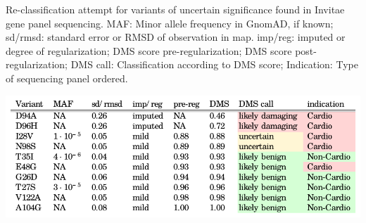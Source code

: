 \begin{table}[h!]
	\centering
	\caption{Re-classification attempt for variants of uncertain significance found in Invitae gene panel sequencing. MAF: Minor allele frequency in GnomAD, if known; sd/rmsd: standard error or RMSD of observation in map. imp/reg: imputed or degree of regularization; DMS score pre-regularization; DMS score post-regularization; DMS call: Classification according to DMS score; Indication: Type of sequencing panel ordered.\newline}
	\includegraphics[width=\textwidth]{img/invitae.pdf}
	\label{tab:invitae}
\end{table}




